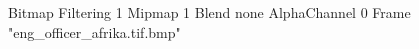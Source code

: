 {Bitmap
	{Filtering 1}
	{Mipmap 1}
	{Blend none}
	{AlphaChannel 0}
	{Frame "eng_officer_afrika.tif.bmp"}
}
